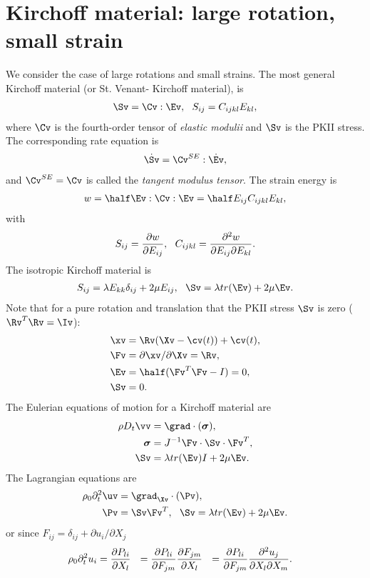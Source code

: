 \section{Kirchoff material: large rotation, small strain}

We consider the case of large rotations and small strains. 
The most general Kirchoff material (or St. Venant- Kirchoff material),  is 
\begin{align}
   \Sv = \Cv : \Ev, ~~ S_{ij} = C_{ijkl} E_{kl},
\end{align}
where $\Cv$ is the fourth-order tensor of {\em elastic modulii} and $\Sv$ is the PKII stress.
% 
The corresponding rate equation is 
\begin{align}
   \dot{\Sv} = \Cv^{SE} : \dot{\Ev},
\end{align}
and $\Cv^{SE}=\Cv$ is called the {\em tangent modulus tensor}. 
% 
The strain energy is 
\begin{align}
   w = \half \Ev : \Cv : \Ev = \half E_{ij} C_{ijkl} E_{kl}, 
\end{align}
with
\begin{align}
   S_{ij} = {\partial w \over \partial E_{ij}}, ~~ C_{ijkl} = {\partial^2 w \over \partial E_{ij}\partial E_{kl}}.
\end{align}
% 
The isotropic Kirchoff material is 
\begin{align}
   S_{ij} = \lambda E_{kk}\delta_{ij} + 2\mu E_{ij}, ~~\Sv = \lambda tr(\Ev) + 2\mu \Ev.
\end{align}
%
Note that for a pure rotation and translation that  the PKII stress $\Sv$ is zero ($\Rv^T\Rv=\Iv$):
\begin{align}
   \xv &= \Rv (\Xv - \cv(t)) + \cv(t) ,\\
   \Fv &= \partial \xv/\partial \Xv = \Rv ,\\
   \Ev &= \half( \Fv^T \Fv - I) = 0,\\
   \Sv &= 0 .
\end{align}
%
The Eulerian equations of motion for a Kirchoff material are 
 \begin{align}
  \rho D_t \vv &= \grad\cdot( \sigmav)   ,\\
  \sigmav &= J^{-1} \Fv\cdot\Sv\cdot\Fv^{T}, \\
  \Sv &= \lambda tr(\Ev) I + 2\mu \Ev . 
\end{align}
The Lagrangian equations are
 \begin{align}
  \rho_0 \partial_t^2 \uv  &= \grad_{\Xv}\cdot( \Pv )   ,\\
  \Pv &= \Sv \Fv^T, ~~
  \Sv = \lambda tr(\Ev) + 2\mu \Ev . 
\end{align}
or since $F_{ij} = \delta_{ij} + \partial u_i / \partial X_j$
\begin{align}
  \rho_0 \partial_t^2 u_i  &= {\partial  P_{li}  \over\partial X_l} ~~ 
    = {\partial P_{li} \over\partial F_{jm}} {\partial F_{jm} \over\partial X_l} ~~
    = {\partial P_{li} \over\partial F_{jm}} {\partial^2 u_j \over\partial X_l \partial X_m}. 
\end{align}

